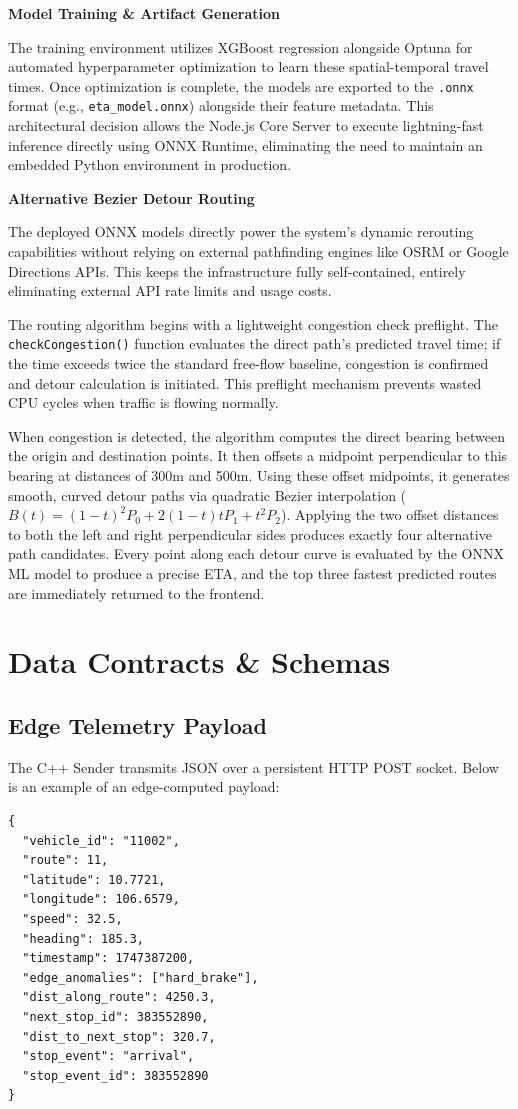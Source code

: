 \documentclass[a4paper]{article}
\begin{document}
\textbf{Model Training \& Artifact Generation}

The training environment utilizes XGBoost regression alongside Optuna for automated hyperparameter optimization to learn these spatial-temporal travel times. Once optimization is complete, the models are exported to the \texttt{.onnx} format (e.g., \texttt{eta\_model.onnx}) alongside their feature metadata. This architectural decision allows the Node.js Core Server to execute lightning-fast inference directly using ONNX Runtime, eliminating the need to maintain an embedded Python environment in production.
\medskip

\textbf{Alternative Bezier Detour Routing}

The deployed ONNX models directly power the system's dynamic rerouting capabilities without relying on external pathfinding engines like OSRM or Google Directions APIs. This keeps the infrastructure fully self-contained, entirely eliminating external API rate limits and usage costs. 

The routing algorithm begins with a lightweight congestion check preflight. The \texttt{checkCongestion()} function evaluates the direct path's predicted travel time; if the time exceeds twice the standard free-flow baseline, congestion is confirmed and detour calculation is initiated. This preflight mechanism prevents wasted CPU cycles when traffic is flowing normally. 

When congestion is detected, the algorithm computes the direct bearing between the origin and destination points. It then offsets a midpoint perpendicular to this bearing at distances of 300m and 500m. Using these offset midpoints, it generates smooth, curved detour paths via quadratic Bezier interpolation ($B(t) = (1-t)^2 P_0 + 2(1-t)t P_1 + t^2 P_2$). Applying the two offset distances to both the left and right perpendicular sides produces exactly four alternative path candidates. Every point along each detour curve is evaluated by the ONNX ML model to produce a precise ETA, and the top three fastest predicted routes are immediately returned to the frontend.

\section{Data Contracts \& Schemas}
\subsection{Edge Telemetry Payload}
The C++ Sender transmits JSON over a persistent HTTP POST socket. Below is an example of an edge-computed payload:
\begin{verbatim}
{
  "vehicle_id": "11002",
  "route": 11,
  "latitude": 10.7721,
  "longitude": 106.6579,
  "speed": 32.5,
  "heading": 185.3,
  "timestamp": 1747387200,
  "edge_anomalies": ["hard_brake"],
  "dist_along_route": 4250.3,
  "next_stop_id": 383552890,
  "dist_to_next_stop": 320.7,
  "stop_event": "arrival",
  "stop_event_id": 383552890
}
\end{verbatim}
\end{document}

